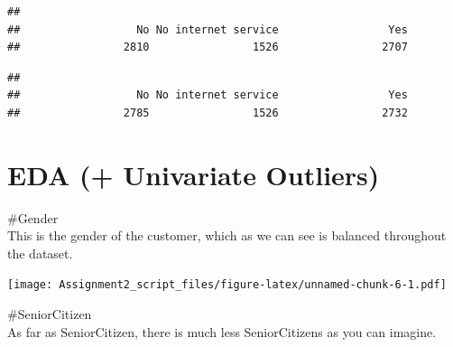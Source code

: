 \documentclass[
]{article}
\newenvironment{Shaded}{\begin{snugshade}}{\end{snugshade}}
\newcommand{\AttributeTok}[1]{\textcolor[rgb]{0.13,0.29,0.53}{#1}}
\newcommand{\CommentTok}[1]{\textcolor[rgb]{0.56,0.35,0.01}{\textit{#1}}}
\newcommand{\FunctionTok}[1]{\textcolor[rgb]{0.13,0.29,0.53}{\textbf{#1}}}
\newcommand{\NormalTok}[1]{#1}
\newcommand{\OtherTok}[1]{\textcolor[rgb]{0.56,0.35,0.01}{#1}}
\newcommand{\SpecialCharTok}[1]{\textcolor[rgb]{0.81,0.36,0.00}{\textbf{#1}}}
\newcommand{\StringTok}[1]{\textcolor[rgb]{0.31,0.60,0.02}{#1}}
\begin{document}
\begin{Shaded}
\end{Shaded}

\begin{verbatim}
## 
##                  No No internet service                 Yes 
##                2810                1526                2707
\end{verbatim}

\begin{Shaded}
\end{Shaded}

\begin{verbatim}
## 
##                  No No internet service                 Yes 
##                2785                1526                2732
\end{verbatim}

\hypertarget{eda-univariate-outliers}{%
\section{EDA (+ Univariate Outliers)}\label{eda-univariate-outliers}}

\#Gender\\
This is the gender of the customer, which as we can see is balanced
throughout the dataset.

\begin{Shaded}
\end{Shaded}

\texttt{[image: Assignment2\_script\_files/figure-latex/unnamed-chunk-6-1.pdf]}

\#SeniorCitizen\\
As far as SeniorCitizen, there is much less SeniorCitizens as you can
imagine.
\end{document}
